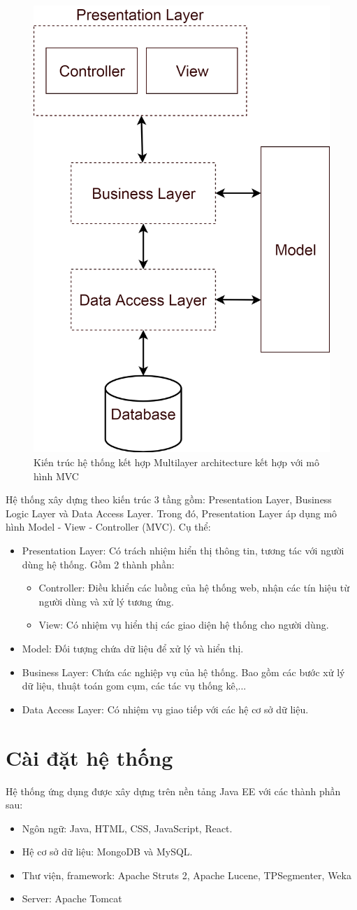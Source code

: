 	\begin{figure}[H]
		\centering
		\includegraphics[width=0.5\linewidth]{Chapter3/Chapter3Figs/Layers}
		\caption{Kiến trúc hệ thống kết hợp Multilayer architecture kết hợp với mô hình MVC}
		\label{fig:layers}
	\end{figure}
Hệ thống xây dựng theo kiến trúc 3 tầng gồm: Presentation Layer, Business Logic Layer và Data Access Layer. Trong đó, Presentation Layer áp dụng mô hình Model - View - Controller (MVC). Cụ thể:
	\begin{itemize}
		\item Presentation Layer: Có trách nhiệm hiển thị thông tin, tương tác với người dùng hệ thống. Gồm 2 thành phần:
			\begin{itemize}
				\item Controller: Điều khiển các luồng của hệ thống web, nhận các tín hiệu từ người dùng và xử lý tương ứng.
				\item View: Có nhiệm vụ hiển thị các giao diện hệ thống cho người dùng.
			\end{itemize}
		\item Model: Đối tượng chứa dữ liệu để xử lý và hiển thị.
		\item Business Layer: Chứa các nghiệp vụ của hệ thống. Bao gồm các bước xử lý dữ liệu, thuật toán gom cụm, các tác vụ thống kê,...
		\item Data Access Layer: Có nhiệm vụ giao tiếp với các hệ cơ sở dữ liệu.
	\end{itemize}

\section{Cài đặt hệ thống}%
Hệ thống ứng dụng được xây dựng trên nền tảng Java EE với các thành phần sau:
	\begin{itemize}
		\item Ngôn ngữ: Java, HTML, CSS, JavaScript, React.
		\item Hệ cơ sở dữ liệu: MongoDB và MySQL.
		\item Thư viện, framework: Apache Struts 2, Apache Lucene, TPSegmenter, Weka
		\item Server: Apache Tomcat
	\end{itemize}

